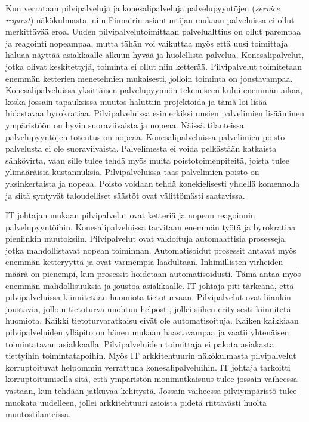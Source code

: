 Kun verrataan pilvipalveluja ja konesalipalveluja palvelupyyntöjen (\emph{service request}) näkökulmasta, niin Finnairin asiantuntijan mukaan palveluissa ei ollut merkittävää eroa. Uuden pilvipalvelutoimittaan palvelualttius on ollut parempaa ja reagointi nopeampaa, mutta tähän voi vaikuttaa myös että uusi toimittaja haluaa näyttää asiakkaalle alkuun hyvää ja huolellista palvelua. Konesalipalvelut, jotka olivat keskitettyjä, toiminta ei ollut niin ketterää. Pilvipalvelut toimitetaan enemmän ketterien menetelmien mukaisesti, jolloin toiminta on joustavampaa. Konesalipalveluissa yksittäisen palvelupyynnön tekemiseen kului enemmän aikaa, koska jossain tapauksissa muutos haluttiin projektoida ja tämä loi lisää hidastavaa byrokratiaa. Pilvipalveluissa esimerkiksi uusien palvelimien lisääminen ympäristöön on hyvin suoraviivaista ja nopeaa. Näissä tilanteissa palvelupyyntöjen toteutus on nopeaa. Konesalipalveluissa palvelimien poisto palvelusta ei ole suoraviivaista. Palvelimesta ei voida pelkästään katkaista sähkövirta, vaan sille tulee tehdä myös muita poistotoimenpiteitä, joista tulee ylimääräisiä kustannuksia. Pilvipalveluissa taas palvelimien poisto on yksinkertaista ja nopeaa. Poisto voidaan tehdä konekielisesti yhdellä komennolla ja siitä syntyvät taloudelliset säästöt ovat välittömästi saatavissa.

IT johtajan mukaan pilvipalvelut ovat ketteriä ja nopean reagoinnin palvelupyyntöihin. Konesalipalveluissa tarvitaan enemmän työtä ja byrokratiaa pieniinkin muutoksiin. Pilvipalvelut ovat vakioituja automaattisia prosesseja, jotka mahdollistavat nopean toiminnan. Automatisoidut prosessit antavat myös enemmän ketteryyttä ja ovat varmempia laadultaan. Inhimillisten virheiden määrä on pienempi, kun prosessit hoidetaan automatisoidusti. Tämä antaa myös enemmän mahdollisuuksia ja joustoa asiakkaalle. IT johtaja piti tärkeänä, että pilvipalveluissa kiinnitetään huomiota tietoturvaan. Pilvipalvelut ovat liiankin joustavia, jolloin tietoturva unohtuu helposti, jollei siihen erityisesti kiinnitetä huomiota. Kaikki tietoturvaratkaisu eivät ole automatisoituja. Kaiken kaikkiaan pilvipalveluiden ylläpito on hänen mukaan haastavampaa ja vaatii yhtenäisen toimintatavan asiakkaalla. Pilvipalveluiden toimittaja ei pakota asiakasta tiettyihin toimintatapoihin. Myös IT arkkitehtuurin näkökulmasta pilvipalvelut korruptoituvat helpommin verrattuna konesalipalveluihin. IT johtaja tarkoitti korruptoitumisella sitä, että ympäristön monimutkaisuus tulee jossain vaiheessa vastaan, kun tehdään jatkuvaa kehitystä. Jossain vaiheessa pilviympäristö tulee muokata uudelleen, jollei arkkitehtuuri asioista pidetä riittävästi huolta muutostilanteissa.  

